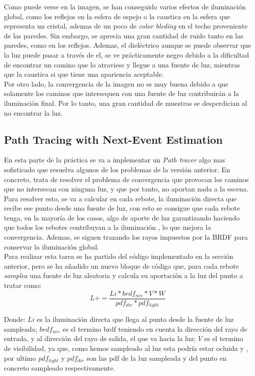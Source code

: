 \documentclass[10pt,oneside,a4paper]{article}
\begin{document}
Como puede verse en la imagen, se han conseguido varios efectos de iluminación global, como los reflejos en la esfera de espejo o la caustica en la esfera que representa un cristal, ademas de un poco de \textit{ color bleding} en el techo proveniente de las paredes. Sin embargo, se aprecia una gran cantidad de ruido tanto en las paredes, como en los reflejos. Ademas, el dieléctrico aunque se puede observar que la luz puede pasar a través de el, se ve prácticamente negro debido a la dificultad de encontrar un camino que lo atraviese y llegue a una fuente de luz, mientras que la caustica si que tiene una apariencia aceptable.\\

Por otro lado, la convergencia de la imagen no es muy buena debido a que solamente los caminos que intersequen con una fuente de luz contribuirán a la iluminación final. Por lo tanto, una gran cantidad de muestras se desperdician al no encontrar la luz.

\subsection{Path Tracing with Next-Event Estimation}
En esta parte de la práctica se va a implementar un \textit{Path tracer} algo mas sofisticado que resuelva algunos de los problemas de la versión anterior. En concreto, trata de resolver el problema de convergencia que provocan los caminos que no intersecan con ninguna luz, y que por tanto, no aportan nada a la escena. Para resolver esto, se va a calcular en cada rebote, la iluminación directa que recibe ese punto desde una fuente de luz, con esto se consigue que cada rebote tenga, en la mayoría de los casos, algo de aporte de luz garantizando haciendo que todos los rebotes contribuyan a la iluminación , lo que mejora la convergencia. Ademas, se siguen trazando los rayos impuestos por la BRDF para conservar la iluminación global.\\

Para realizar esta tarea se ha partido del código implementado en la sección anterior, pero se ha añadido un nuevo bloque de código que, para cada rebote \textit{samplea} una fuente de luz aleatoria y calcula su aportación a la luz del punto a tratar como:
$$ L += \frac{Li * brdf_{nee} * V * W}{pdf_{dir} * pdf_{light}}$$

Donde: $Li$ es la iluminación directa que llega al punto desde la fuente de luz sampleada; $brdf_{nee}$ es el termino brdf teniendo en cuenta la dirección del rayo de entrada, y al dirección del rayo de salida, el que va hacia la luz; $V$ es el termino de visibilidad, ya que, como hemos sampleado al luz esta podría estar ocluida y , por ultimo $pdf_{light}$ y $pdf_{dir}$ son las pdf de la luz sampleada y del punto en concreto sampleado respectivamente. \\
\end{document}
